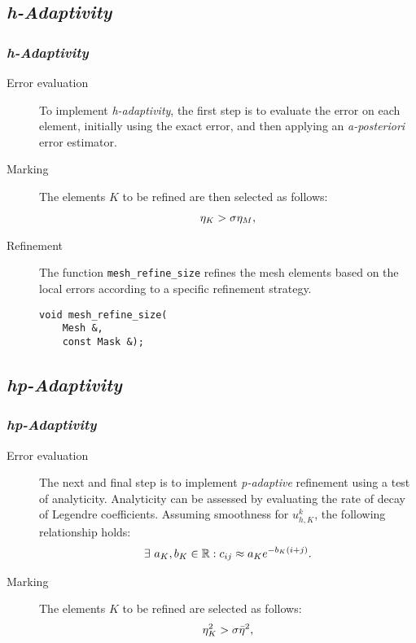 \subsection{\textit{h-Adaptivity}}

\begin{frame}[fragile]
    \frametitle{\textit{h-Adaptivity}}

    \begin{description}
        \item[Error evaluation] To implement \textit{h-adaptivity}, the first step is to evaluate the error on each element, initially using the exact error, and then applying an \textit{a-posteriori} error estimator.
        \item[Marking] The elements $K$ to be refined are then selected as follows:
            \begin{gather}
                \eta_K > \sigma \eta_{M}, \notag
            \end{gather}
        \item[Refinement] The function \lstinline{mesh_refine_size} refines the mesh elements based on the local errors according to a specific refinement strategy.
\begin{lstlisting}[style=cpp]
void mesh_refine_size(
    Mesh &, 
    const Mask &);
\end{lstlisting}
    \end{description}

\end{frame}

\subsection{\textit{hp-Adaptivity}}

\begin{frame}[fragile]
    \frametitle{\textit{hp-Adaptivity}}

    \begin{description}
        \item[Error evaluation] The next and final step is to implement \textit{p-adaptive} refinement using a test of analyticity. Analyticity can be assessed by evaluating the rate of decay of Legendre coefficients. Assuming smoothness for $u^k_{h, K}$, the following relationship holds:
        \begin{gather}
            \exists ~ a_K, b_K \in \mathbb{R} : c_{ij} \approx a_K e^{-b_K (i + j)}. \notag
        \end{gather}
        \item[Marking] The elements $K$ to be refined are selected as follows:
        \begin{gather}
            \eta_K^2 > \sigma \bar{\eta}^2, \notag
        \end{gather}
    \end{description}

\end{frame}


